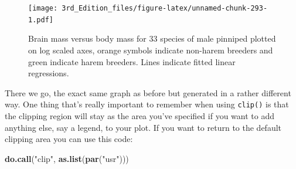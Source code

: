 \documentclass[
]{book}
\newenvironment{Shaded}{\begin{snugshade}}{\end{snugshade}}
\newcommand{\DataTypeTok}[1]{\textcolor[rgb]{0.13,0.29,0.53}{#1}}
\newcommand{\DecValTok}[1]{\textcolor[rgb]{0.00,0.00,0.81}{#1}}
\newcommand{\KeywordTok}[1]{\textcolor[rgb]{0.13,0.29,0.53}{\textbf{#1}}}
\newcommand{\NormalTok}[1]{#1}
\newcommand{\OperatorTok}[1]{\textcolor[rgb]{0.81,0.36,0.00}{\textbf{#1}}}
\newcommand{\StringTok}[1]{\textcolor[rgb]{0.31,0.60,0.02}{#1}}
\begin{document}
\begin{Shaded}
\end{Shaded}

\begin{figure}
\centering
\texttt{[image: 3rd\_Edition\_files/figure-latex/unnamed-chunk-293-1.pdf]}
\caption{\label{fig:unnamed-chunk-293}Brain mass versus body mass for 33 species of male pinniped plotted on log scaled axes, orange symbols indicate non-harem breeders and green indicate harem breeders. Lines indicate fitted linear regressions.}
\end{figure}

There we go, the exact same graph as before but generated in a rather different way. One thing that's really important to remember when using \texttt{clip()} is that the clipping region will stay as the area you've specified if you want to add anything else, say a legend, to your plot. If you want to return to the default clipping area you can use this code:

\begin{Shaded}
\begin{Highlighting}[]
\KeywordTok{do.call}\NormalTok{(}\StringTok{"clip"}\NormalTok{, }\KeywordTok{as.list}\NormalTok{(}\KeywordTok{par}\NormalTok{(}\StringTok{"usr"}\NormalTok{)))}
\end{Highlighting}
\end{Shaded}
\end{document}
